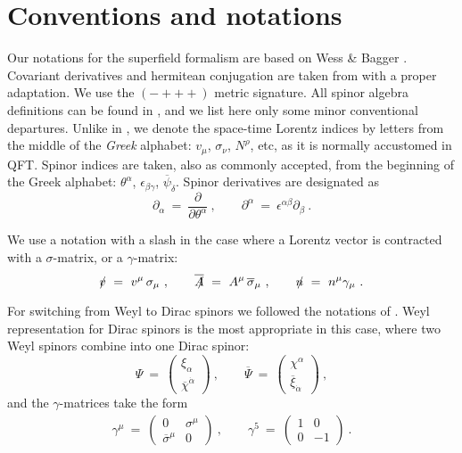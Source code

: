 \documentclass[12pt]{revtex4}
\newcommand{\slashed}[1]{\hbox{{$#1$}\llap{$/$}}}
\begin{document}
\section{Conventions and notations}
\label{app_conventions}

Our notations for the superfield formalism are based on 
Wess \& Bagger \cite{Wess:1992cp}.
Covariant derivatives and hermitean conjugation are taken from
\cite{Gates:1983nr} with a proper adaptation. 
We use the  $ (-+++) $ metric signature.
All spinor algebra definitions can be found in 
\cite{Wess:1992cp},
and we list here only some minor conventional departures.
Unlike in \cite{Wess:1992cp}, we denote the space-time Lorentz
indices by letters from the middle of the \emph{Greek}
alphabet:
$ v_\mu $, $ \sigma_\nu $, $ N^\rho $, etc,
as it is normally accustomed in QFT.
Spinor indices are taken, also as commonly accepted, from the
beginning of the Greek alphabet:
$ \theta^\alpha $, $ \epsilon_{\beta\gamma} $, 
$ \overline{\psi}_{\dot\delta}$.
Spinor derivatives are designated as
\[ 
\partial_\alpha ~=~ \frac{\partial}{\partial\theta^\alpha}~,
\qquad
\partial^\alpha ~=~ \epsilon^{\alpha\beta}\partial_\beta~.
\]

We use a notation with a slash in the case where a Lorentz
vector is contracted with a $ \sigma $-matrix, or a $ \gamma $-matrix:
%
\begin{equation}
\nonumber 
\slashed{v} ~=~ v^\mu\, \sigma_\mu~, 
\qquad
\overline{\slashed{A}} ~=~ A^\mu\, \overline{\sigma}_\mu~, 
\qquad
\slashed{n} ~=~ n^\mu \gamma_\mu~.
\end{equation}
%

For switching from Weyl to Dirac spinors we followed the notations of 
\cite{Martin:1997ns}.
Weyl representation for Dirac spinors is the most appropriate in this case,
where two Weyl spinors combine into one Dirac spinor:
\[
\Psi ~=~  
\left (
\begin{array}{c}
  \xi_\alpha \\
\overline{\chi}^{\dot\alpha}
\end{array}
\right )~,
\qquad
\overline{\Psi} ~=~  
\left (
\begin{array}{c}
  \chi^\alpha \\
\overline{\xi}_{\dot\alpha}
\end{array}
\right )~,
\]
and the $ \gamma $-matrices take the form
\begin{eqnarray*}
\gamma^\mu ~=~ 
\left ( 
\begin{array}{cc}
0                    &    \sigma^\mu \\
                     \overline{\sigma}^\mu   &         0    
\end{array}
\right )~,
\qquad
\gamma^5 ~=~ 
\left ( 
\begin{array}{cc}
1      &         0  \\
                        0      &        -1    
\end{array}
\right )~.
\end{eqnarray*}
\end{document}
